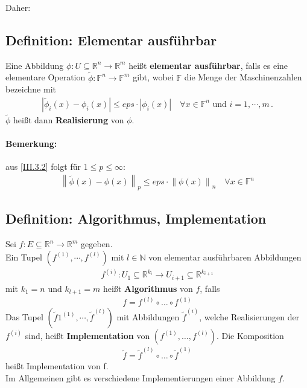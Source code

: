 \documentclass[ngerman,fontsize=11pt, paper=a4, parskip=half, titlepage=true, toc=bib]{scrbook}
\newcommand{\R}{\mathds{R}}
\newcommand{\Ren}{\mathds{R}^{n}}
\newcommand{\N}{\mathds{N}}
\newcommand{\F}{\mathds{F}}
\newcommand{\nn}[1]{\left\| #1 \right\|}
\begin{document}
Daher:

\subsection{Definition: Elementar ausführbar}
Eine Abbildung $\phi : U\subseteq \Ren \rightarrow \R^m$ heißt
\textbf{elementar ausführbar}, falls es 
eine elementare Operation $\widetilde{\phi}:\F^n \rightarrow \F^m$
gibt, wobei $\F$ die Menge der Maschinenzahlen bezeichne mit
\begin{gather}
	|\widetilde{\phi}_i(x)-\phi_i(x)| \leq eps\cdot |\phi_i(x) | 
	\quad \forall x\in \F^n \text{ und } i=1,\cdots , m \label{III.3.2}\, .
\end{gather}
$\widetilde{\phi}$ heißt dann \textbf{Realisierung} von $\phi$.

\paragraph{Bemerkung:}
aus \eqref{III.3.2} folgt für $1\leq p\leq \infty$:
\begin{gather}
	\nn{\widetilde{\phi}(x)-\phi(x)}_p \leq eps\cdot\nn{\phi(x)}_n 
	\quad \forall x\in\F^n \label{III.3.3}
\end{gather}


\subsection{Definition: Algorithmus, Implementation}
Sei $f:E\subseteq \Ren \rightarrow \R^m$ gegeben.\\
Ein Tupel $\left(f^{(1)},\cdots ,f^{(l)}\right)$ mit $l\in \N$ von elementar ausführbaren
Abbildungen
\begin{gather*}
	f^{(i)}: U_1\subseteq \R^{k_i} \rightarrow U_{i+1}\subseteq \R^{k_{i+1}}
\end{gather*}
mit $k_1=n$ und $k_{l+1}=m$ heißt \textbf{Algorithmus} von $f$, falls
\begin{gather*}
	f=f	^{(l)}\circ \dotsc \circ f^{(1)}
\end{gather*}
Das Tupel $(\widetilde{f}1^{(1)},\cdots ,\widetilde{f}^{(l)})$ mit Abbildungen $\widetilde{f}^{(i)}$, welche Realisierungen der $f^{(i)}$ sind,
heißt \textbf{Implementation} von 
$\left(f^{(1)},\dotsc ,f^{(l)}\right)$.
Die Komposition 
\begin{gather*}
		\widetilde{f}=\widetilde{f}	^{(l)}\circ \dotsc \circ \widetilde{f}^{(1)}
\end{gather*}
heißt Implementation von f. \\
Im Allgemeinen gibt es verschiedene Implementierungen einer Abbildung $f$.
\end{document}
